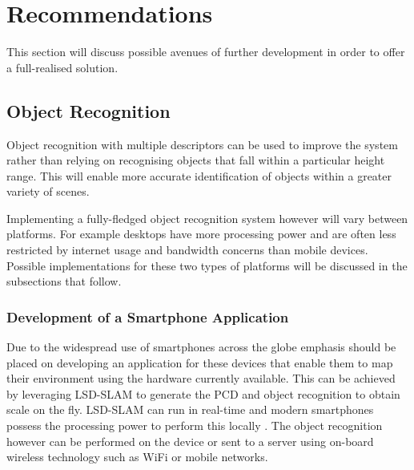 
\chapter{Recommendations} %
\label{Chapter6}

This section will discuss possible avenues of further development in order to offer a full-realised solution.

\section{Object Recognition}
Object recognition with multiple descriptors can be used to improve the system rather than relying on recognising objects that fall within a particular height range. This will enable more accurate identification of objects within a greater variety of scenes. 

Implementing a fully-fledged object recognition system however will vary between platforms. For example desktops have more processing power and are often less restricted by internet usage and bandwidth concerns than mobile devices.  Possible implementations for these two types of platforms will be discussed in the subsections that follow.

\subsection{Development of a Smartphone Application}
Due to the widespread use of smartphones across the globe emphasis should be placed on developing an application for these devices that enable them to map their environment using the hardware currently available. This can be achieved by leveraging LSD-SLAM to generate the PCD and object recognition to obtain scale on the fly. LSD-SLAM can run in real-time and modern smartphones possess the processing power to perform this locally \citep{caruso_large-scale_2015}. The object recognition however can be performed on the device or sent to a server using on-board wireless technology such as WiFi or mobile networks. 

